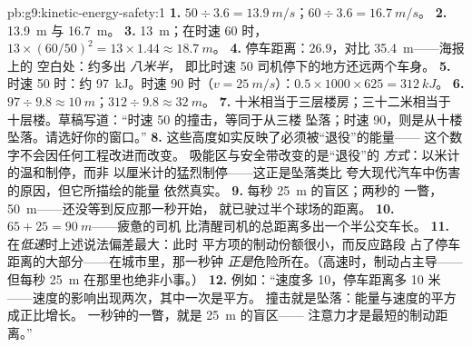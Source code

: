 \begin{solution}{pb:g9:kinetic-energy-safety:1}
\textbf{1.} $50 \div 3.6 = \qty{13.9}{m/s}$；$60 \div 3.6 =
\qty{16.7}{m/s}$。
\textbf{2.} \qty{13.9}{m} 与 \qty{16.7}{m}。
\textbf{3.} \qty{13}{m}；在时速 60 时，$13 \times (60/50)^2 =
13 \times 1.44 \approx \qty{18.7}{m}$。
\textbf{4.} 停车距离：$26.9$，对比 \qty{35.4}{m}——海报上的
空白处：约多出 \emph{八米半}，
即比时速 50 司机停下的地方还远两个车身。
\textbf{5.} 时速 50 时：约 \qty{97}{kJ}。时速 90 时（$v =
\qty{25}{m/s}$）：$0.5 \times 1000 \times 625 =
\qty{312}{kJ}$。
\textbf{6.} $97 \div 9.8 \approx \qty{10}{m}$；$312 \div 9.8
\approx \qty{32}{m}$。
\textbf{7.} 十米相当于三层楼房；三十二米相当于
十层楼。草稿写道：“时速 50 的撞击，等同于从三楼
坠落；时速 90，则是从十楼坠落。请选好你的窗口。”
\textbf{8.} 这些高度如实反映了必须被“退役”的能量——
这个数字不会因任何工程改进而改变。
吸能区与安全带改变的是“退役”的
\emph{方式}：以米计的温和制停，而非
以厘米计的猛烈制停——这正是坠落类比
夸大现代汽车中伤害的原因，但它所描绘的能量
依然真实。
\textbf{9.} 每秒 \qty{25}{m} 的盲区；两秒的
一瞥，\qty{50}{m}——还没等到反应那一秒开始，
就已驶过半个球场的距离。
\textbf{10.} $65 + 25 = \qty{90}{m}$——疲惫的司机
比清醒司机的总距离多出一个半公交车长。
\textbf{11.} 在\emph{低速}时上述说法偏差最大：此时
平方项的制动份额很小，而反应路段
占了停车距离的大部分——在城市里，那一秒钟
\emph{正是}危险所在。（高速时，制动占主导——
但每秒 \qty{25}{m} 在那里也绝非小事。）
\textbf{12.} 例如：“速度多 10，停车距离多
10 米——速度的影响出现两次，其中一次是平方。
撞击就是坠落：能量与速度的平方成正比增长。
一秒钟的一瞥，就是 \qty{25}{m} 的盲区——
注意力才是最短的制动距离。”
\end{solution}
